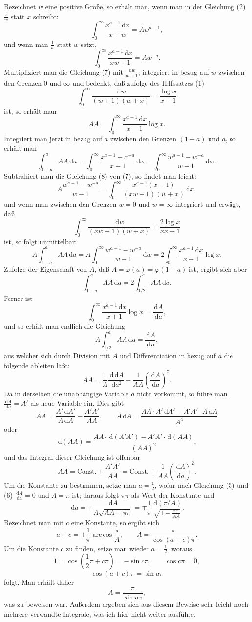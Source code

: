 \documentclass[11pt]{article}
\newcommand{\dd}{\,\mathrm d}
\newcommand{\arccosop}{\operatorname{arc\,cos}}
\begin{document}
Bezeichnet $w$ eine positive Größe, so erhält man, wenn man in der Gleichung (2) $\frac{x}{w}$ statt $x$ schreibt:
\begin{equation}
\int_0^\infty\frac{x^{a-1}\dd x}{x+w}=Aw^{a-1},
\tag{7}
\end{equation}
und wenn man $\frac1w$ statt $w$ setzt,
\begin{equation}
\int_0^\infty\frac{x^{a-1}\dd x}{xw+1}=Aw^{-a}.
\tag{8}
\end{equation}
Multipliziert man die Gleichung (7) mit $\frac{\dd w}{w+1}$, integriert in bezug auf $w$ zwischen den Grenzen $0$ und $\infty$ und bedenkt, daß zufolge des Hilfssatzes (1)
\[
\int_0^\infty\frac{\dd w}{(w+1)(w+x)}=\frac{\log x}{x-1}
\]
ist, so erhält man
\[
AA=\int_0^\infty\frac{x^{a-1}\dd x}{x-1}\log x.
\]
Integriert man jetzt in bezug auf $a$ zwischen den Grenzen $(1-a)$ und $a$, so erhält man
\[
\int_{1-a}^{a}AA\dd a
=\int_0^\infty\frac{x^{a-1}-x^{-a}}{x-1}\dd x
=\int_0^\infty\frac{w^{a-1}-w^{-a}}{w-1}\dd w.
\]
Subtrahiert man die Gleichung (8) von (7), so findet man leicht:
\[
A\frac{w^{a-1}-w^{-a}}{w-1}
=\int_0^\infty\frac{x^{a-1}(x-1)}{(xw+1)(w+x)}\dd x,
\]
und wenn man zwischen den Grenzen $w=0$ und $w=\infty$ integriert und erwägt, daß
\[
\int_0^\infty\frac{\dd w}{(xw+1)(w+x)}=\frac{2\log x}{xx-1}
\]
ist, so folgt unmittelbar:
\[
A\int_{1-a}^{a}AA\dd a
=A\int_0^\infty\frac{w^{a-1}-w^{-a}}{w-1}\dd w
=2\int_0^\infty\frac{x^{a-1}\dd x}{x+1}\log x.
\]
Zufolge der Eigenschaft von $A$, daß $A=\varphi(a)=\varphi(1-a)$ ist, ergibt sich aber
\[
\int_{1-a}^{a}AA\dd a=2\int_{1/2}^{a}AA\dd a.
\]
Ferner ist
\[
\int_0^\infty\frac{x^{a-1}\dd x}{x+1}\log x=\frac{\dd A}{\dd a},
\]
und so erhält man endlich die Gleichung
\[
A\int_{1/2}^{a}AA\dd a=\frac{\dd A}{\dd a},
\]
aus welcher sich durch Division mit $A$ und Differentiation in bezug auf $a$ die folgende ableiten läßt:
\[
AA=\frac1A\frac{\dd\dd A}{\dd a^2}-\frac1{AA}\left(\frac{\dd A}{\dd a}\right)^2.
\]
Da in derselben die unabhängige Variable $a$ nicht vorkommt, so führe man $\frac{\dd A}{\dd a}=A'$ als neue Variable ein. Dies gibt
\[
AA=\frac{A'\dd A'}{A\dd A}-\frac{A'A'}{AA},\qquad
A\dd A=\frac{AA\cdot A'\dd A'-A'A'\cdot A\dd A}{A^4}
\]
oder
\[
\dd(AA)=\frac{AA\cdot\dd(A'A')-A'A'\cdot\dd(AA)}{(AA)^2},
\]
und das Integral dieser Gleichung ist offenbar
\[
AA=\mathrm{Const.}+\frac{A'A'}{AA}
=\mathrm{Const.}+\frac1{AA}\left(\frac{\dd A}{\dd a}\right)^2.
\]
Um die Konstante zu bestimmen, setze man $a=\frac12$, wofür nach Gleichung (5) und (6) $\frac{\dd A}{\dd a}=0$ und $A=\pi$ ist; daraus folgt $\pi\pi$ als Wert der Konstante und
\[
\dd a=\pm\frac{\dd A}{A\sqrt{AA-\pi\pi}}
=\mp\frac1\pi\frac{\dd(\pi/A)}{\sqrt{1-\frac{\pi\pi}{AA}}}.
\]
Bezeichnet man mit $c$ eine Konstante, so ergibt sich
\[
a+c=\pm\frac1\pi\arccosop\frac\pi A,
\qquad
A=\frac{\pi}{\cos(a+c)\pi}.
\]
Um die Konstante $c$ zu finden, setze man wieder $a=\frac12$, woraus
\[
1=\cos\left(\frac12\pi+c\pi\right)=-\sin c\pi,
\qquad \cos c\pi=0,
\]
\[
\cos(a+c)\pi=\sin a\pi
\]
folgt. Man erhält daher
\[
A=\frac\pi{\sin a\pi},
\]
was zu beweisen war. Außerdem ergeben sich aus diesem Beweise sehr leicht noch mehrere verwandte Integrale, was ich hier nicht weiter ausführe.
\end{document}
